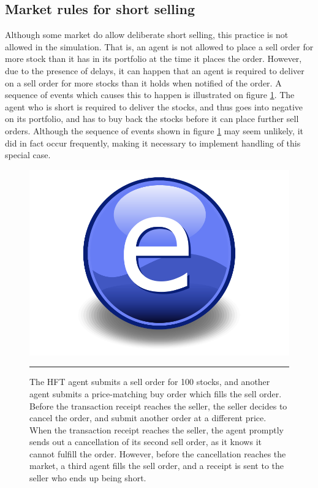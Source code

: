 \subsection{Market rules for short selling}
Although some market do allow deliberate short selling, this practice is not allowed in the simulation. That is, an agent is not allowed to place a sell order for more stock than it has in its portfolio at the time it places the order. However, due to the presence of delays, it can happen that an agent is required to deliver on a sell order for more stocks than it holds when notified of the order. A sequence of events which causes this to happen is  illustrated on figure \ref{fig:short_selling}. The agent who is short is required to deliver the stocks, and thus goes into negative on its portfolio, and has to buy back the stocks before it can place further sell orders. Although the sequence of events shown in figure \ref{fig:short_selling} may seem unlikely, it did in fact occur frequently, making it necessary to implement handling of this special case. 
\begin{figure}[htbp]
	\centering
		\includegraphics{Figures/Electron.pdf}
		\rule{35em}{0.5pt}
	\caption{The HFT agent submits a sell order for 100 stocks, and another agent submits a price-matching buy order which fills the sell order. Before the transaction receipt reaches the seller, the seller decides to cancel the order, and submit another order at a different price. When the transaction receipt reaches the seller, the agent promptly sends out a cancellation of its second sell order, as it knows it cannot fulfill the order. However, before the cancellation reaches the market, a third agent fills the sell order, and a receipt is sent to the seller who ends up being short.}
	\label{fig:short_selling}
\end{figure}



